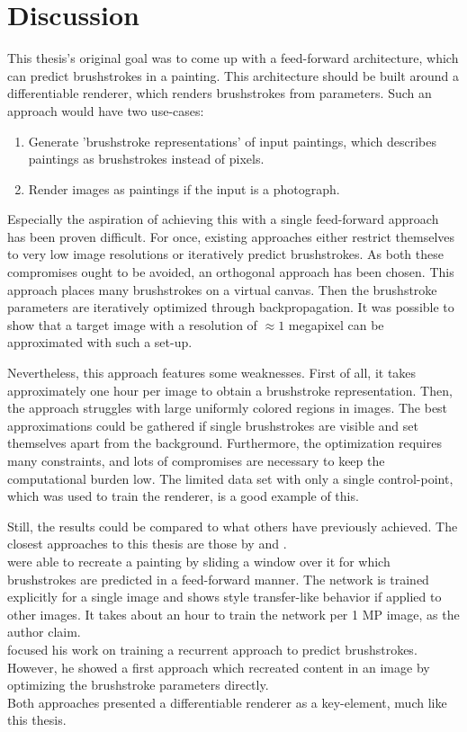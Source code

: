 \setchapterpreamble[u]{\margintoc}
\chapter{Discussion}

This thesis's original goal was to come up with a feed-forward architecture, which can predict brushstrokes in a painting.
This architecture should be built around a differentiable renderer, which renders brushstrokes from parameters.
Such an approach would have two use-cases:
\begin{enumerate}
    \item Generate 'brushstroke representations' of input paintings, which describes paintings as brushstrokes instead of pixels.
    \item Render images as paintings if the input is a photograph.
\end{enumerate}

Especially the aspiration of achieving this with a single feed-forward approach has been proven difficult.
For once, existing approaches either restrict themselves to very low image resolutions or iteratively predict brushstrokes.
As both these compromises ought to be avoided, an orthogonal approach has been chosen.
This approach places many brushstrokes on a virtual canvas.
Then the brushstroke parameters are iteratively optimized through backpropagation.
It was possible to show that a target image with a resolution of $\approx 1$ megapixel can be approximated with such a set-up.

Nevertheless, this approach features some weaknesses.
First of all, it takes approximately one hour per image to obtain a brushstroke representation.
Then, the approach struggles with large uniformly colored regions in images.
The best approximations could be gathered if single brushstrokes are visible and set themselves apart from the background.
Furthermore, the optimization requires many constraints, and lots of compromises are necessary to keep the computational burden low.
The limited data set with only a single control-point, which was used to train the renderer, is a good example of this.

Still, the results could be compared to what others have previously achieved.
The closest approaches to this thesis are those by \citeauthor*{LpaintB} and \citeauthor*{neuralpainters}.\\
\citeauthor*{LpaintB} were able to recreate a painting by sliding a window over it for which brushstrokes are predicted in a feed-forward manner.
The network is trained explicitly for a single image and shows style transfer-like behavior if applied to other images.
It takes about an hour to train the network per 1 MP image, as the author claim.\\
\citeauthor*{neuralpainters} focused his work on training a recurrent approach to predict brushstrokes.
However, he showed a first approach which recreated content in an image by optimizing the brushstroke parameters directly.\\
Both approaches presented a differentiable renderer as a key-element, much like this thesis.

